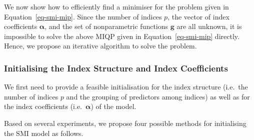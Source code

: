 \documentclass[
  11pt,
  a4paper,
]{report}
\begin{document}
We now show how to efficiently find a minimiser for the problem given in
Equation~\ref{eq-smi-mip}. Since the number of indices \(p\), the vector
of index coefficients \(\bm{\alpha}\), and the set of nonparametric
functions \(\bm{g}\) are all unknown, it is impossible to solve the
above MIQP given in Equation~\ref{eq-smi-mip} directly. Hence, we
propose an iterative algorithm to solve the problem.

\subsubsection{Initialising the Index Structure and Index
Coefficients}\label{sec-step1}

We first need to provide a feasible initialisation for the index
structure (i.e.~the number of indices \(p\) and the grouping of
predictors among indices) as well as for the index coefficients
(i.e.~\(\bm{\alpha}\)) of the model.

Based on several experiments, we propose four possible methods for
initialising the SMI model as follows.
\end{document}
